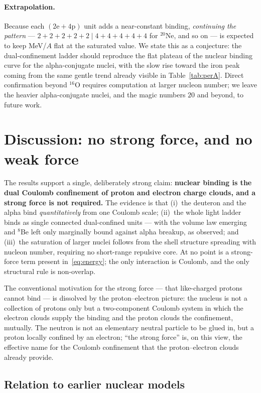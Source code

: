 \documentclass[11pt]{article}
\begin{document}
\paragraph{Extrapolation.} Because each $(\mathrm{2e}+\mathrm{4p})$ unit adds a near-constant
binding, \emph{continuing the pattern} --- $2{+}2{+}2{+}2{+}2\mid 4{+}4{+}4{+}4{+}4$ for
$^{20}$Ne, and so on --- is expected to keep MeV/$A$ flat at the saturated value. We state this
as a conjecture: the dual-confinement ladder should reproduce the flat plateau of the nuclear
binding curve for the alpha-conjugate nuclei, with the slow rise toward the iron peak coming
from the same gentle trend already visible in Table~\ref{tab:perA}. Direct confirmation beyond
$^{16}$O requires computation at larger nucleon number; we leave the heavier alpha-conjugate
nuclei, and the magic numbers $20$ and beyond, to future work.

\section{Discussion: no strong force, and no weak force}

The results support a single, deliberately strong claim: \textbf{nuclear binding is the dual
Coulomb confinement of proton and electron charge clouds, and a strong force is not required.}
The evidence is that (i)~the deuteron and the alpha bind \emph{quantitatively} from one Coulomb
scale; (ii)~the whole light ladder binds as single connected dual-confined units --- with the
volume law emerging and $^8$Be left only marginally bound against alpha breakup, as observed;
and (iii)~the saturation of larger nuclei follows from the shell
structure spreading with nucleon number, requiring no short-range repulsive core. At no point is
a strong-force term present in~\eqref{eq:energy}; the only interaction is Coulomb, and the only
structural rule is non-overlap.

The conventional motivation for the strong force --- that like-charged protons cannot bind ---
is dissolved by the proton--electron picture: the nucleus is not a collection of protons only
but a two-component Coulomb system in which the electron clouds supply the binding and the
proton clouds the confinement, mutually. The neutron is not an elementary neutral particle to be
glued in, but a proton locally confined by an electron; ``the strong force'' is, on this view,
the effective name for the Coulomb confinement that the proton--electron clouds already provide.

\subsection{Relation to earlier nuclear models}
\end{document}

